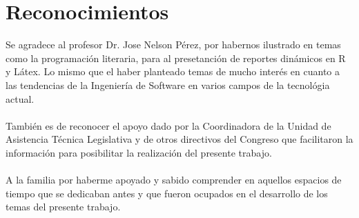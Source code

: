 \documentclass[conference]{IEEEtran}\usepackage[]{graphicx}\usepackage[]{color}
\begin{document}



\section*{Reconocimientos}

Se agradece al profesor Dr. Jose Nelson Pérez, por habernos ilustrado en temas como la programación literaria, para al presetanción de reportes dinámicos en R y Látex. Lo mismo que el haber planteado temas de mucho interés en cuanto a las tendencias de la Ingeniería de Software en varios campos de la tecnológia actual. \\ \\
También es de reconocer el apoyo dado por la Coordinadora de la Unidad de Asistencia Técnica Legislativa y de otros directivos del Congreso que facilitaron la información para posibilitar la realización del presente trabajo.\\  \\
A la familia por haberme apoyado y sabido comprender en aquellos espacios de tiempo que se dedicaban antes y que fueron ocupados en el desarrollo de los temas del presente trabajo.


\end{document}
